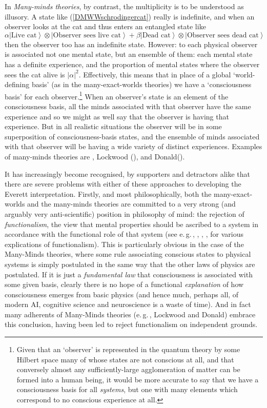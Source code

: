 \documentclass[12pt]{article}
\newcommand{\egc}{\mbox{e.\,g.\,}}
\newcommand{\be}{\begin{equation}}
\newcommand{\ee}{\end{equation}}
\newcommand{\ket}[1]{\ensuremath{\left|  #1 \right\rangle}}
\newcommand{\tpk}[2]{\ensuremath{\ket{#1}\!\otimes\!\ket{#2}}}
\begin{document}
In \emph{Many-minds theories}, by contrast, the multiplicity is to be understood as illusory. A state like (\ref{DMWWschrodingercat}) really is indefinite, and when an observer looks at the cat and thus enters an entangled state like
\be\alpha\tpk{\mathrm{\mbox{Live cat}}}{\mathrm{\mbox{Observer sees live cat}}}+\beta\tpk{\mathrm{\mbox{Dead cat}}}{\mathrm{\mbox{Observer sees dead cat}}}\ee
then the observer too has an indefinite state. However: to each physical observer is associated not one mental state, but an ensemble of them: each mental state has a definite experience, and the proportion of mental states where the observer sees the cat alive is $|\alpha|^2$. Effectively, this means that in place of a global `world-defining basis' (as in the many-exact-worlds theories) we have a `consciousness basis' for each observer.\footnote{Given that an `observer' is represented in the quantum theory by some Hilbert space many of whose states are not conscious at all, and that conversely almost any sufficiently-large agglomeration of matter can be formed into a human being, it would be more accurate to say that we have a consciousness basis for all \emph{systems}, but one with many elements which correspond to no conscious experience at all.} When an observer's state is an element of the consciousness basis, all the minds associated with that observer have the same experience and so we might as well say that the observer is having that experience. But in all realistic situations the observer will be in some superposition of consciousness-basis states, and the ensemble of minds associated with that observer will be having a wide variety of distinct experiences. Examples of many-minds theories are , Lockwood (),  and Donald().

It has increasingly become recognised, by supporters and detractors alike that there are severe problems with either of these approaches to developing the Everett interpretation. Firstly, and most philosophically, both the many-exact-worlds and the many-minds theories are committed to a very strong (and arguably very anti-scientific) position in philosophy of mind: the rejection of \emph{functionalism}, the view that mental properties should be ascribed to a system in accordance with the functional role of that system (see \egc, , , ,  for various explications of functionalism). This is particularly obvious in the case of the Many-Minds theories, where some rule associating conscious states to physical systems is simply postulated in the same way that the other laws of physics are postulated. If it is just a \emph{fundamental law} that consciousness is associated with some given basis, clearly there is no hope of a functional \emph{explanation} of how consciousness emerges from basic physics (and hence much, perhaps all, of modern AI, cognitive science and neuroscience is a waste of time). And in fact many adherents of Many-Minds theories (\egc, Lockwood and Donald) embrace this conclusion, having been led to reject functionalism on independent grounds.
\end{document}
